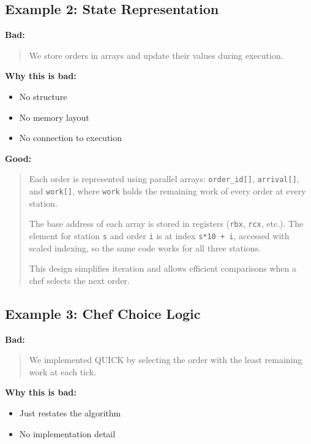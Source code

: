 \documentclass[a4paper,12pt]{article}
\begin{document}
\subsection*{Example 2: State Representation}

\textbf{Bad:}
\begin{quote}
We store orders in arrays and update their values during execution.
\end{quote}

\textbf{Why this is bad:}
\begin{itemize}
\item No structure
\item No memory layout
\item No connection to execution
\end{itemize}

\textbf{Good:}
\begin{quote}
Each order is represented using parallel arrays:
\texttt{order\_id[]}, \texttt{arrival[]}, and \texttt{work[]}, where \texttt{work} holds the remaining work of every order at every station. 

The base address of each array is stored in registers (\texttt{rbx}, \texttt{rcx}, etc.). The element for station \texttt{s} and order \texttt{i} is at index \texttt{s*10 + i}, accessed with scaled indexing, so the same code works for all three stations. 

This design simplifies iteration and allows efficient comparisons when a chef selects the next order. 

\end{quote}

\subsection*{Example 3: Chef Choice Logic}

\textbf{Bad:}
\begin{quote}
We implemented QUICK by selecting the order with the least remaining work at each tick.
\end{quote}

\textbf{Why this is bad:}
\begin{itemize}
\item Just restates the algorithm
\item No implementation detail
\end{itemize}
\end{document}
